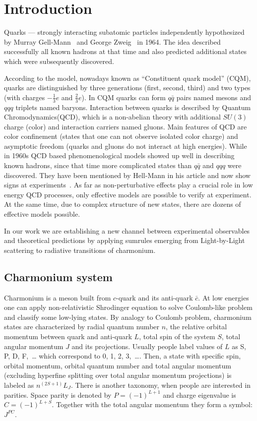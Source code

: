 \chapter{Introduction}
Quarks --- strongly interacting subatomic particles independently hypothesized by Murray Gell-Mann~\cite{gellmann-quarks} and George Zweig~\cite{zweig-quarks} in 1964. The idea described successfully all known hadrons at that time and also predicted additional states which were subsequently discovered.

According to the model, nowadays known as ``Constituent quark model'' (CQM), quarks are distinguished by three generations (first, second, third) and two types (with charges $-\frac{1}{3}e$ and $\frac{2}{3}e$). In CQM quarks can form $q \bar{q}$ pairs named mesons and $qqq$ triplets named baryons. Interaction between quarks is described by Quantum Chromodynamics(QCD), which is a non-abelian theory with additional $SU(3)$ charge (color) and  interaction carriers named gluons. Main features of QCD are color confinement (states that one can not observe isolated color charge) and asymptotic freedom (quarks and gluons do not interact at high energies).
While in 1960s QCD based phenomenological models showed up well in describing known hadrons, since that time more complicated states than $q\bar{q}$ and $qqq$ were discovered. They have been mentioned by Hell-Mann in his article and now show signs at experiments~\cite{Xbabar,Xbelle,Ybabar}. As far as non-perturbative effects play a crucial role in low energy QCD processes, only effective models are possible to verify at experiment. At the same time, due to complex structure of new states, there are dozens of effective models possible.

In our work we are establishing a new channel between experimental observables and theoretical predictions by applying sumrules emerging from Light-by-Light scattering to radiative transitions of charmonium.

\section{Charmonium system}
Charmonium is a meson built from $c$-quark and its anti-quark $\bar{c}$. At low energies one can apply non-relativistic Shrodinger equation to solve Coulomb-like problem and classify some low-lying states. By analogy to Coulomb problem, charmonium states are characterized by radial quantum number $n$, the relative orbital momentum between quark and anti-quark $L$, total spin of the system $S$, total angular momentum $J$ and its projections. Usually people label values of $L$ as S, P, D, F,~…  which correspond to 0, 1, 2, 3,~…. Then, a state with specific spin, orbital momentum, orbital quantum number and total angular momentum (excluding hyperfine splitting over total angular momentum projections) is labeled as $n^{(2S+1)} L_J$. There is another taxonomy, when people are interested in parities. Space parity is denoted by $P = (-1)^{L+1}$ and charge eigenvalue is $C = (-1)^{L+S}$. Together with the total angular momentum they form a symbol: $J^{P C}$.

